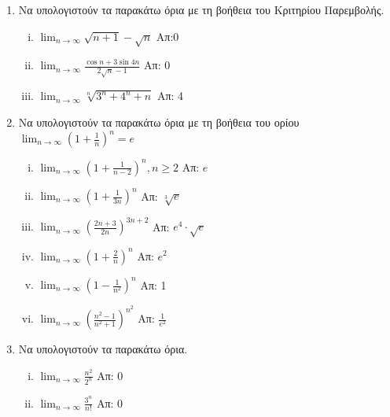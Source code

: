 \begin{enumerate}
    \item Να υπολογιστούν τα παρακάτω όρια με τη βοήθεια του Κριτηρίου 
        Παρεμβολής.

        \begin{enumerate}[i)]
            \item $ \lim_{n \to \infty} \sqrt{n+1} - \sqrt{n}  $ \hfill Απ:0
            \item $ \lim_{n \to \infty} \frac{\cos{n} + 3 \sin{4n}}{ 2
                \sqrt{n} -1} $ \hfill Απ: 0  
            \item $ \lim_{n \to \infty} \sqrt[n]{3^{n}+4^{n}+n} $ \hfill Απ:
                4 
        \end{enumerate}

    \item Να υπολογιστούν τα παρακάτω όρια με τη βοήθεια του ορίου 
        $ \lim_{n \to \infty} \left(1+ \frac{1}{n}\right)^{n}=e $

        \begin{enumerate}[i)]
            \item $ \lim_{n \to \infty} \left(1+ \frac{1}{n-2}\right)^{n}, 
                n \geq 2 $ 
                \hfill Απ: $e$  
            \item $ \lim_{n \to \infty} \left(1 + \frac{1}{3n}\right)^{n} $ 
                \hfill Απ: $ \sqrt[3]{e} $ 
            \item $ \lim_{n \to \infty} \left(\frac{2n +3}{2n} 
                \right)^{3n+2}  $
                \hfill Απ: $ e^{4}\cdot \sqrt{e} $ 
            \item $ \lim_{n \to \infty} \left(1+ \frac{2}{n}\right)^{n} $ 
                \hfill Απ: $ e^{2} $ 
            \item $ \lim_{n \to \infty}\left(1-\frac{1}{n^{2}} \right)^{n} $ 
                \hfill Απ: 1 
            \item $ \lim_{n \to \infty} \left(\frac{n^{2}-1}{n^{2}+1} 
                \right)^{n^{2}} $
                \hfill Απ: $ \frac{1}{e^{2}} $ 
        \end{enumerate}

    \item Να υπολογιστούν τα παρακάτω όρια.

        \begin{enumerate}[i)]
            \item $ \lim_{n \to \infty}  \frac{n^{2}}{2^{n}} $ \hfill Απ: 0 
            \item $ \lim_{n \to \infty} \frac{3^{n}}{n!} $ \hfill Απ: 0 
        \end{enumerate}


\end{enumerate}




